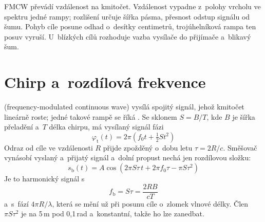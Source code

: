 \documentclass[czech]{skyren}
\begin{document}

\begin{skyrenglance}
FMCW převádí vzdálenost na kmitočet. Vzdálenost vypadne z~polohy vrcholu
ve spektru jedné rampy; rozlišení určuje šířka pásma, přesnost odstup
signálu od šumu. Pohyb cíle posune odhad o~desítky centimetrů, trojúhelníková
rampa ten posuv vyruší. U~blízkých cílů rozhoduje vazba vysílače do
přijímače a~blikavý šum.
\end{skyrenglance}

\section{Chirp a~rozdílová frekvence}

 (frequency-modulated continuous wave) vysílá spojitý signál,
jehož kmitočet lineárně roste; jedné takové rampě se říká .
Se sklonem $S = B/T$, kde $B$ je šířka přeladění a~$T$ délka chirpu, má
vysílaný signál fázi
\[
\varphi_\mathrm{t}(t) = 2\pi\left(f_0 t + \tfrac{1}{2} S t^2\right)
\]
Odraz od cíle ve vzdálenosti $R$ přijde zpožděný o~dobu letu $\tau = 2R/c$.
Směšovač vynásobí vyslaný a~přijatý signál a~dolní propust nechá jen
rozdílovou složku:
\[
s_\mathrm{b}(t) = A\cos\!\left(2\pi S\tau\,t + 2\pi f_0\tau - \pi S\tau^2\right)
\]
Je to harmonický signál s~
\[
f_\mathrm{b} = S\tau = \frac{2RB}{cT}
\]
a~s~fází $4\pi R/\lambda$, která se mění už při posunu cíle o~zlomek vlnové
délky. Člen $\pi S\tau^2$ je na 5\,m pod 0,1\,rad a~konstantní, takže ho lze
zanedbat.
\end{document}
